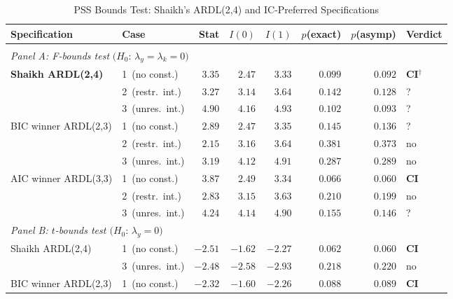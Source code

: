 
\begin{table}[htbp]
	\centering
	\caption{PSS Bounds Test: Shaikh's ARDL(2,4) and IC-Preferred Specifications}
	\label{tab:S0_table2}
	\begin{threeparttable}
		\small
		\begin{tabular}{l l r r r r r l}
			\toprule
			Specification & Case & Stat & $I(0)$ & $I(1)$ & $p$(exact) & $p$(asymp) & Verdict \\
			\hline\hline \\			%
			\multicolumn{8}{l}{\textit{Panel A: F-bounds test} $\bigl(H_0:\, \lambda_y = \lambda_k = 0\bigr)$} \\[5pt]
			\textbf{Shaikh ARDL(2,4)}
			& 1~(no const.)    & $3.35$ & $2.47$ & $3.33$ & $0.099$ & $0.092$ & \textbf{CI}$^{\dagger}$ \\
			& 2~(restr.\ int.) & $3.27$ & $3.14$ & $3.64$ & $0.142$ & $0.128$ & ? \\
			& 3~(unres.\ int.) & $4.90$ & $4.16$ & $4.93$ & $0.102$ & $0.093$ & ? \\[4pt]
			BIC winner ARDL(2,3)
			& 1~(no const.)    & $2.89$ & $2.47$ & $3.35$ & $0.145$ & $0.136$ & ? \\
			& 2~(restr.\ int.) & $2.15$ & $3.16$ & $3.64$ & $0.381$ & $0.373$ & no \\
			& 3~(unres.\ int.) & $3.19$ & $4.12$ & $4.91$ & $0.287$ & $0.289$ & no \\[4pt]
			AIC winner ARDL(3,3)
			& 1~(no const.)    & $3.87$ & $2.49$ & $3.34$ & $0.066$ & $0.060$ & \textbf{CI} \\
			& 2~(restr.\ int.) & $2.83$ & $3.15$ & $3.63$ & $0.210$ & $0.199$ & no \\
			& 3~(unres.\ int.) & $4.24$ & $4.14$ & $4.90$ & $0.155$ & $0.146$ & ? \\[4pt]
			\midrule
			\multicolumn{8}{l}{\textit{Panel B: $t$-bounds test
					$\bigl(H_0:\, \lambda_y = 0\bigr)$}} \\[3pt]
			Shaikh ARDL(2,4)
			& 1~(no const.)    & $-2.51$ & $-1.62$ & $-2.27$ & $0.062$ & $0.060$ & \textbf{CI} \\
			& 3~(unres.\ int.) & $-2.48$ & $-2.58$ & $-2.93$ & $0.218$ & $0.220$ & no \\[4pt]
			BIC winner ARDL(2,3)
			& 1~(no const.)    & $-2.32$ & $-1.60$ & $-2.26$ & $0.088$ & $0.089$ & \textbf{CI} \\

\end{tabular}
\end{threeparttable}
\end{table}
